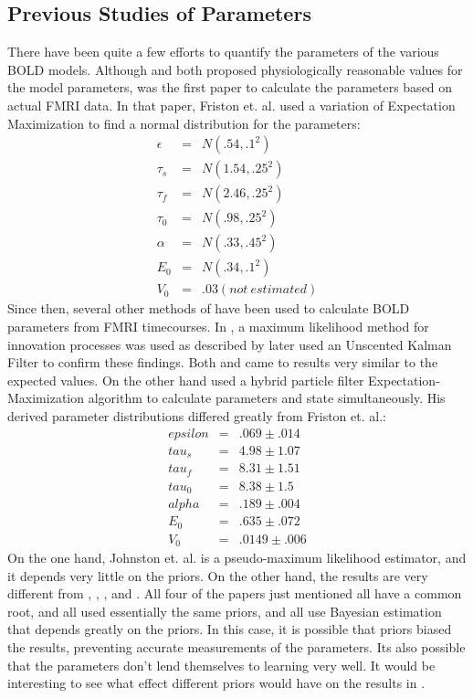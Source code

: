 \documentclass{article}
\begin{document}
\subsection{Previous Studies of Parameters}
There have been quite a few efforts to quantify the parameters of the
various BOLD models.  Although \cite{Buxton1998} and \cite{Friston2000}
both proposed physiologically reasonable values for the model parameters, 
\cite{Friston2002} was the first paper to calculate the parameters based 
on actual FMRI data. In that paper, Friston et. al. used a variation of
Expectation Maximization to find a normal distribution for the parameters:
\begin{eqnarray}
\epsilon &=& N(.54 , .1 ^2 )  \nonumber \\
\tau_s & =&  N(1.54, .25^2)   \nonumber \\
\tau_f & =&  N(2.46, .25^2)   \nonumber \\
\tau_0 & =&  N(.98 , .25^2 )   \nonumber \\
\alpha & =&  N(.33 , .45^2 )   \nonumber \\
E_0   & =&  N(.34 ,  .1 ^2 )   \nonumber \\
V_0  & = &  .03 (not\ estimated) \nonumber
\end{eqnarray}
Since then, several other methods of have been used to calculate
BOLD parameters from FMRI timecourses. In \cite{Riera2004}, a maximum
likelihood method for innovation processes was used as described by
\cite{Ozaki1994}
later \cite{Hu2009} used an Unscented Kalman Filter to confirm these findings.
Both \cite{Hu2009} and \cite{Friston2002} came to results very similar to the
expected values.
On the other hand \cite{Johnston2008} used a hybrid particle filter Expectation-
Maximization algorithm to calculate parameters and state simultaneously.
His derived parameter distributions differed greatly from Friston et. al.:
\begin{eqnarray}
epsilon &=& .069 \pm .014    \nonumber \\
tau_s & =& 4.98 \pm 1.07  \nonumber \\
tau_f & =& 8.31 \pm 1.51   \nonumber \\
tau_0 & =& 8.38 \pm 1.5    \nonumber \\
alpha & =& .189 \pm .004   \nonumber \\
E_0   & =& .635 \pm .072     \nonumber \\
V_0   & =& .0149 \pm .006     \nonumber 
\end{eqnarray}
On the one hand, Johnston et. al. is a pseudo-maximum likelihood estimator, and 
it depends very little on the priors. On the other hand, the results are very 
different from \cite{Buxton1998}, \cite{Hu2009}, \cite{Friston2000}, and 
\cite{Friston2002}. All four of the papers just mentioned all have a common root,
and all used essentially the same priors, and all use Bayesian estimation
that depends greatly on the priors. In this case, it is possible that priors
biased the results, preventing accurate measurements of the parameters. Its also
possible that the parameters don't lend themselves to learning very well. 
It would be interesting to see what
effect different priors would have on the results in \cite{Friston2002}.
\end{document}
